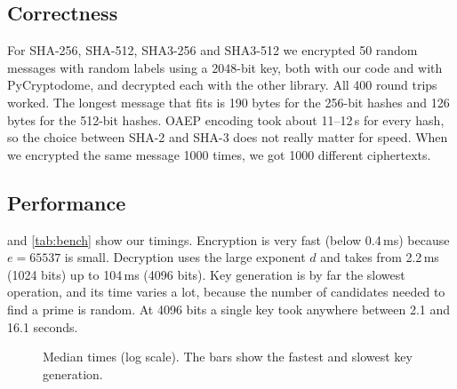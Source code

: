 \documentclass[runningheads]{llncs}
\begin{document}
\subsection{Correctness}

For SHA-256, SHA-512, SHA3-256 and SHA3-512 we encrypted 50 random messages
with random labels using a 2048-bit key, both with our code and with
PyCryptodome, and decrypted each with the other library. All 400 round trips
worked. The longest message that fits is 190 bytes for the 256-bit hashes
and 126 bytes for the 512-bit hashes. OAEP encoding took about
11--12\,\textmu s for every hash, so the choice between SHA-2 and SHA-3 does
not really matter for speed. When we encrypted the same message 1000 times,
we got 1000 different ciphertexts.

\subsection{Performance}

 and \cref{tab:bench} show our timings. Encryption is very
fast (below 0.4\,ms) because $e = 65537$ is small. Decryption uses the large
exponent $d$ and takes from 2.2\,ms (1024 bits) up to 104\,ms (4096 bits).
Key generation is by far the slowest operation, and its time varies a lot,
because the number of candidates needed to find a prime is random. At 4096
bits a single key took anywhere between 2.1 and 16.1 seconds.

\begin{figure}[t]
\centering
{}
\caption{Median times (log scale). The bars show the fastest and slowest key
generation.}\label{fig:perf}
\end{figure}
\end{document}
